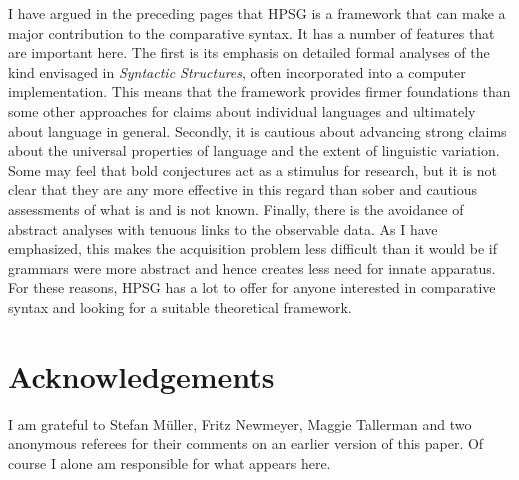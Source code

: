 \documentclass[output=paper]{langsci/langscibook}
\begin{document}
I have argued in the preceding pages that \gls{HPSG} is a framework that can
make a major contribution to the comparative syntax. It has a number of
features that are important here. The first is its emphasis on detailed formal
analyses of the kind envisaged in \emph{Syntactic Structures}, often
incorporated into a computer implementation. This means that the framework
provides firmer foundations than some other approaches for claims about
individual languages and ultimately about language in general. Secondly, it is
cautious about advancing strong claims about the universal properties of
language and the extent of linguistic variation. Some may feel that bold
conjectures act as a stimulus for research, but it is not clear that they are
any more effective in this regard than sober and cautious assessments of what
is and is not known. Finally, there is the avoidance of abstract analyses with
tenuous links to the observable data. As I have emphasized, this makes the
acquisition problem less difficult than it would be if grammars were more
abstract and hence creates less need for innate apparatus. For these reasons,
\gls{HPSG} has a lot to offer for anyone interested in comparative syntax and
looking for a suitable theoretical framework.\largerpage

\printchapterglossary{}

\section*{Acknowledgements}

I am grateful to Stefan Müller, Fritz Newmeyer, Maggie Tallerman and two
anonymous referees for their comments on an earlier version of this paper. Of
course I alone am responsible for what appears here.

{\sloppy
\printbibliography[heading=subbibliography,notkeyword=this]
}
\end{document}
